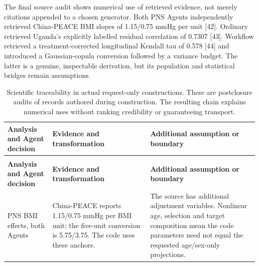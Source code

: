 \documentclass[11pt,letterpaper]{article}
\begin{document}
The final source audit shows numerical use of retrieved evidence, not merely citations appended to a chosen generator. Both PNS Agents independently retrieved China-PEACE BMI slopes of 1.15/\allowbreak{}0.75 mmHg per unit [42]. Ordinary retrieved Uganda's explicitly labelled residual correlation of 0.7307 [43]. Workflow retrieved a treatment-corrected longitudinal Kendall tau of 0.578 [44] and introduced a Gaussian-copula conversion followed by a variance budget. The latter is a genuine, inspectable derivation, but its population and statistical bridges remain assumptions.


\FloatBarrier

\begingroup

\small

\renewcommand{\arraystretch}{1.22}

\begin{xltabular}{\linewidth}{@{}>{\raggedright\arraybackslash}X>{\raggedright\arraybackslash}X>{\raggedright\arraybackslash}X@{}}

\caption{Scientific traceability in actual request-only constructions. These are postclosure audits of records authored during construction. The resulting chain explains numerical uses without ranking credibility or guaranteeing transport.}\label{tab:6} \\

\toprule

\textbf{Analysis and Agent decision} & \textbf{Evidence and transformation} & \textbf{Additional assumption or boundary} \\

\midrule

\endfirsthead

\\

\toprule

\textbf{Analysis and Agent decision} & \textbf{Evidence and transformation} & \textbf{Additional assumption or boundary} \\

\midrule

\endhead

\bottomrule

\endfoot

PNS BMI effects, both Agents & China-PEACE reports 1.15/\allowbreak{}0.75 mmHg per BMI unit; the five-unit conversion is 5.75/\allowbreak{}3.75. The code uses these anchors. & The source has additional adjustment variables. Nonlinear age, selection and target composition mean the code parameters need not equal the requested age/\allowbreak{}sex-only projections. \\


\end{xltabular}
\end{document}
